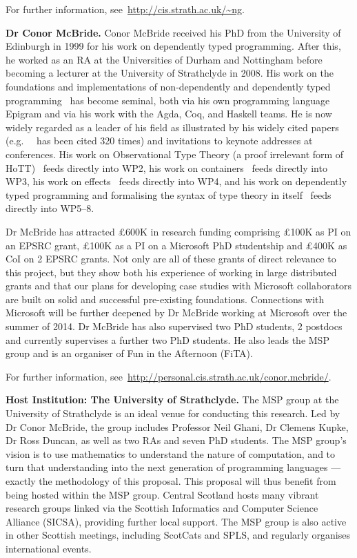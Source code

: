 \documentclass[a4paper,11pt]{article}
\newcommand{\eg}{{e.g.}\ }
\begin{document}
For further information, see~\url{http://cis.strath.ac.uk/~ng}.

\textbf{Dr Conor McBride.} Conor McBride received his PhD from the
University of Edinburgh in 1999 for his work on dependently typed
programming. After this, he worked as an RA at the Universities of
Durham and Nottingham before becoming a lecturer at the University of
Strathclyde in 2008. His work on the foundations and implementations
of non-dependently and dependently typed
programming~\cite{viewftl,alti:ott-conf,easy,mcbride:outrageous} has
become seminal, both via his own programming language Epigram and via
his work with the Agda, Coq, and Haskell teams. He is now widely
regarded as a leader of his field as illustrated by his widely cited
papers (\eg ~\cite{viewftl} has been cited 320 times) and invitations
to keynote addresses at conferences. His work on Observational Type
Theory (a proof irrelevant form of HoTT)~\cite{alti:ott-conf} feeds directly
into WP2, his work on containers~\cite{alti:mpc04} feeds directly into WP3, his
work on effects~\cite{conor:frank} feeds directly into WP4, and his work on
dependently typed programming and formalising the syntax of type
theory in itself~\cite{viewftl,alti:ott-conf,easy,mcbride:outrageous}
feeds directly into WP5--8.

Dr McBride has attracted \pounds 600K in research funding comprising
\pounds 100K as PI on an EPSRC grant, \pounds 100K as a PI on a
Microsoft PhD studentship and \pounds 400K as CoI on 2 EPSRC
grants. Not only are all of these grants of direct relevance to this
project, but they show both his experience of working in large
distributed grants and that our plans for developing case studies with
Microsoft collaborators are built on solid and successful pre-existing
foundations. Connections with Microsoft will be further deepened by Dr
McBride working at Microsoft over the summer of 2014.  Dr McBride has
also supervised two PhD students, 2 postdocs and currently supervises
a further two PhD students. He also leads the MSP group and is an
organiser of Fun in the Afternoon (FiTA).

For further information,
see~\url{http://personal.cis.strath.ac.uk/conor.mcbride/}.

\textbf{Host Institution: The University of Strathclyde.} The MSP
group at the University of Strathclyde is an ideal venue for
conducting this research. Led by Dr Conor McBride, the group includes
Professor Neil Ghani, Dr Clemens Kupke, Dr Ross Duncan, as well as two
RAs and seven PhD students. The MSP group's vision is to use
mathematics to understand the nature of computation, and to turn that
understanding into the next generation of programming languages ---
exactly the methodology of this proposal. This proposal will thus 
benefit from being hosted within the MSP group. Central Scotland hosts many vibrant
research groups linked via the Scottish Informatics and Computer
Science Alliance (SICSA), providing further local support. The MSP group is also active in other
Scottish meetings, including ScotCats and SPLS, and regularly
organises international events.
\end{document}
